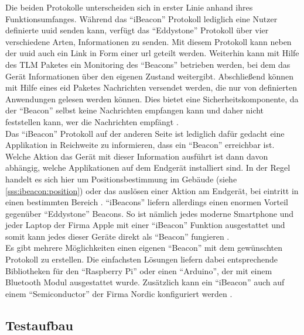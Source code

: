 \noindent Die beiden Protokolle unterscheiden sich in erster Linie anhand ihres Funktionsumfanges. Während das "`iBeacon"' Protokoll lediglich eine Nutzer definierte \ac{uuid} senden kann, verfügt das "`Eddystone"' Protokoll über vier verschiedene Arten, Informationen zu senden. Mit diesem Protokoll kann neben der \ac{uuid} auch ein Link in Form einer \ac{url} geteilt werden. Weiterhin kann mit Hilfe des TLM Paketes ein Monitoring des "`Beacons"' betrieben werden, bei dem das Gerät Informationen über den eigenen Zustand weitergibt. Abschließend können mit Hilfe eines \ac{eid} Paketes Nachrichten versendet werden, die nur von definierten Anwendungen gelesen werden können. Dies bietet eine Sicherheitskomponente, da der "`Beacon"' selbst keine Nachrichten empfangen kann und daher nicht feststellen kann, wer die Nachrichten empfängt \cite{EDD:WWW}.\\

\noindent Das "`iBeacon"' Protokoll auf der anderen Seite ist lediglich dafür gedacht eine Applikation in Reichweite zu informieren, dass ein "`Beacon"' erreichbar ist. Welche Aktion das Gerät mit dieser Information ausführt ist dann davon abhängig, welche Applikationen auf dem Endgerät installiert sind. In der Regel handelt es sich hier um Positionsbestimmung im Gebäude (siehe \ref{sss:ibeacon:position}) oder das auslösen einer Aktion am Endgerät, bei eintritt in einen bestimmten Bereich \cite[Seite 32f]{Gast14:BPA}. "`iBeacons"' liefern allerdings einen enormen Vorteil gegenüber "`Eddystone"' Beacons. So ist nämlich jedes moderne Smartphone und jeder Laptop der Firma Apple mit einer "`iBeacon"' Funktion ausgestattet und somit kann jedes dieser Geräte direkt als "`Beacon"' fungieren \cite[Seite 21]{Gast14:BPA}.\\     

\noindent Es gibt mehrere Möglichkeiten einen eigenen "`Beacon"' mit dem gewünschten Protokoll zu erstellen. Die einfachsten Lösungen liefern dabei entsprechende Bibliotheken für den "`Raspberry Pi"' oder einen "`Arduino"', der mit einem Bluetooth Modul ausgestattet wurde. Zusätzlich kann ein "`iBeacon"' auch auf einem "`Semiconductor"' der Firma Nordic konfiguriert werden \cite[Seite 21]{Gast14:BPA}.

\subsection{Testaufbau}
\label{ss:ibeacon:kommunikation}

